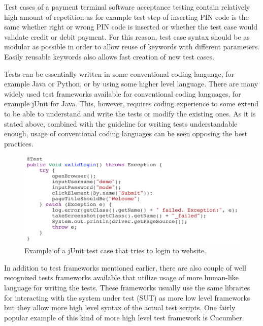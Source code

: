 Test cases of a payment terminal software acceptance testing contain relatively high amount of repetition as for example test step of inserting PIN code is the same whether right or wrong PIN code is inserted or whether the test case would validate credit or debit payment. For this reason, test case syntax should be as modular as possible in order to allow reuse of keywords with different parameters. Easily reusable keywords also allows fast creation of new test cases.

Tests can be essentially written in some conventional coding language, for example Java or Python, or by using some higher level language. There are many widely used test frameworks available for conventional coding languages, for example jUnit for Java. This, however, requires coding experience to some extend to be able to understand and write the tests or modify the existing ones. As it is stated above, combined with the guideline for writing tests understandable enough, usage of conventional coding languages can be seen opposing the best practices. 

\begin{figure}[ht]
  \begin{center}
    \includegraphics[width=13cm]{images/junit_example.png}
    \caption{Example of a jUnit test case that tries to login to website.}
    \label{fig:robot_example}
  \end{center}
\end{figure}
\FloatBarrier

In addition to test frameworks mentioned earlier, there are also couple of well recognized tests frameworks available that utilize usage of more human-like language for writing the tests. These frameworks usually use the same libraries for interacting with the system under test (SUT) as more low level frameworks but they allow more high level syntax of the actual test scripts. One fairly popular example of this kind of more high level test framework is Cucumber. 

